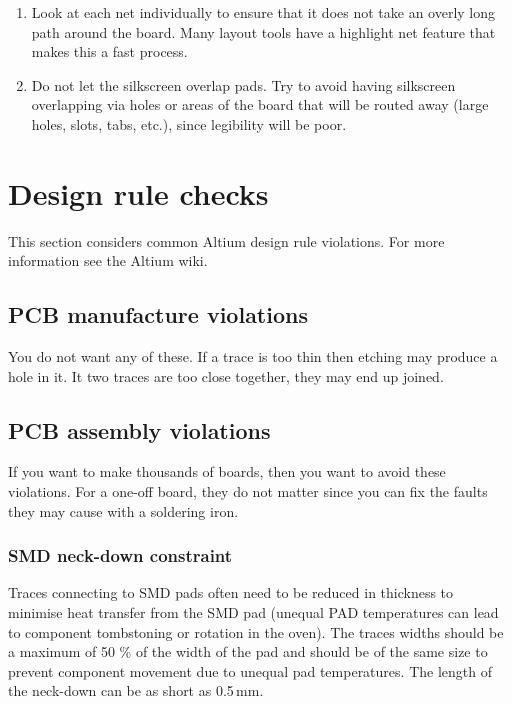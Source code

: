 \begin{enumerate}
\item Look at each net individually to ensure that it does not take an
  overly long path around the board. Many layout tools have a
  highlight net feature that makes this a fast process.

\item Do not let the silkscreen overlap pads. Try to avoid having
  silkscreen overlapping via holes or areas of the board that will be
  routed away (large holes, slots, tabs, etc.), since legibility will
  be poor.

 \end{enumerate}



\section{Design rule checks}


This section considers common Altium design rule violations.  For more
information see the Altium wiki.



\subsection{PCB manufacture violations}

You do not want any of these.  If a trace is too thin then etching may
produce a hole in it.  It two traces are too close together, they may
end up joined.


\subsection{PCB assembly violations}

If you want to make thousands of boards, then you want to avoid these
violations.  For a one-off board, they do not matter since you can fix
the faults they may cause with a soldering iron.

\subsubsection{SMD neck-down constraint}

Traces connecting to SMD pads often need to be reduced in thickness to
minimise heat transfer from the SMD pad (unequal PAD temperatures can
lead to component tombstoning or rotation in the oven).  The traces
widths should be a maximum of 50 \% of the width of the pad and should
be of the same size to prevent component movement due to unequal pad
temperatures.  The length of the neck-down can be as short as 0.5\,mm.

